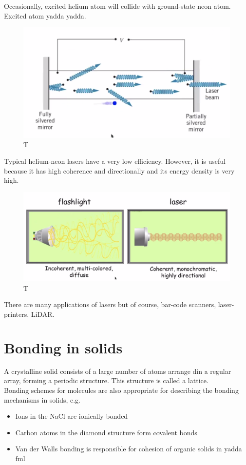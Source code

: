 \documentclass[class=article,crop=false]{standalone}
\begin{document}
Occasionally, excited helium atom will collide with ground-state neon atom. Excited atom yadda yadda.

\begin{figure}[h!]
	\centering
	\includegraphics[width=.6\linewidth]{./Images/schematic_of_laser.png}
	\caption{T}
\end{figure}

Typical helium-neon lasers have a very low efficiency. However, it is useful because it has high coherence and directionally and its energy density is very high.

\begin{figure}[h!]
	\centering
	\includegraphics[width=.6\linewidth]{./Images/lasers_rock.png}
	\caption{T}
\end{figure}

There are many applications of lasers but of course, bar-code scanners, laser-printers, LiDAR.

\section{Bonding in solids}
A crystalline solid consists of a large number of atoms arrange din a regular array, forming a periodic structure. This structure is called a lattice.\\

Bonding schemes for molecules are also appropriate for describing the bonding mechanisms in solids, e.g.
\begin{itemize}
	\item Ions in the NaCl are ionically bonded
	\item Carbon atoms in the diamond structure form covalent bonds
	\item Van der Walls bonding is responsible for cohesion of organic solids in yadda fml
\end{itemize}
\end{document}

